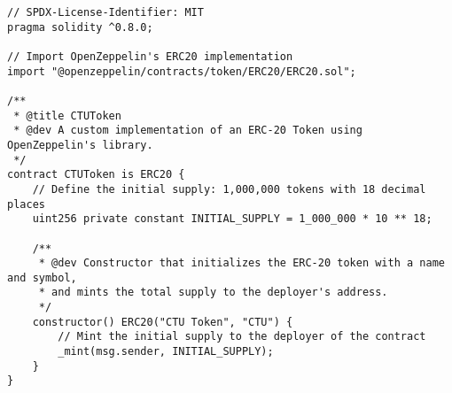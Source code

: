 \documentclass[12pt]{article}
\begin{document}
\begin{verbatim}
// SPDX-License-Identifier: MIT
pragma solidity ^0.8.0;

// Import OpenZeppelin's ERC20 implementation
import "@openzeppelin/contracts/token/ERC20/ERC20.sol";

/**
 * @title CTUToken
 * @dev A custom implementation of an ERC-20 Token using OpenZeppelin's library.
 */
contract CTUToken is ERC20 {
    // Define the initial supply: 1,000,000 tokens with 18 decimal places
    uint256 private constant INITIAL_SUPPLY = 1_000_000 * 10 ** 18;

    /**
     * @dev Constructor that initializes the ERC-20 token with a name and symbol,
     * and mints the total supply to the deployer's address.
     */
    constructor() ERC20("CTU Token", "CTU") {
        // Mint the initial supply to the deployer of the contract
        _mint(msg.sender, INITIAL_SUPPLY);
    }
}
\end{verbatim}
\end{document}
